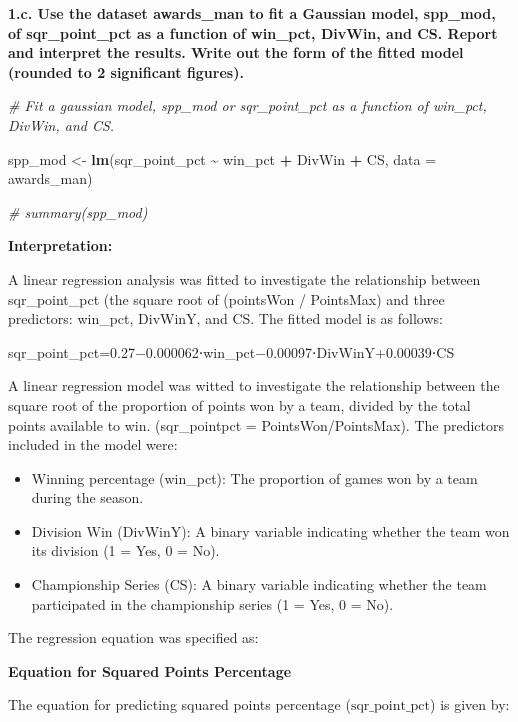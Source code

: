 \documentclass[
]{article}
\newenvironment{Shaded}{\begin{snugshade}}{\end{snugshade}}
\newcommand{\AttributeTok}[1]{\textcolor[rgb]{0.13,0.29,0.53}{#1}}
\newcommand{\CommentTok}[1]{\textcolor[rgb]{0.56,0.35,0.01}{\textit{#1}}}
\newcommand{\FunctionTok}[1]{\textcolor[rgb]{0.13,0.29,0.53}{\textbf{#1}}}
\newcommand{\NormalTok}[1]{#1}
\newcommand{\OtherTok}[1]{\textcolor[rgb]{0.56,0.35,0.01}{#1}}
\newcommand{\SpecialCharTok}[1]{\textcolor[rgb]{0.81,0.36,0.00}{\textbf{#1}}}
\begin{document}
\textbf{1.c. Use the dataset awards\_man to fit a Gaussian model,
spp\_mod, of sqr\_point\_pct as a function of win\_pct, DivWin, and CS.
Report and interpret the results. Write out the form of the fitted model
(rounded to 2 significant figures).}

\begin{Shaded}
\begin{Highlighting}[]
\CommentTok{\# Fit a gaussian model, spp\_mod or sqr\_point\_pct as a function of win\_pct, DivWin, and CS.}

\NormalTok{spp\_mod }\OtherTok{\textless{}{-}} \FunctionTok{lm}\NormalTok{(sqr\_point\_pct }\SpecialCharTok{\textasciitilde{}}\NormalTok{ win\_pct }\SpecialCharTok{+}\NormalTok{ DivWin }\SpecialCharTok{+}\NormalTok{ CS, }\AttributeTok{data =}\NormalTok{ awards\_man)}

\CommentTok{\# summary(spp\_mod)}
\end{Highlighting}
\end{Shaded}

\textbf{Interpretation:}

A linear regression analysis was fitted to investigate the relationship
between sqr\_point\_pct (the square root of (pointsWon / PointsMax) and
three predictors: win\_pct, DivWinY, and CS. The fitted model is as
follows:

sqr\_point\_pct=0.27−0.000062⋅win\_pct−0.00097⋅DivWinY+0.00039⋅CS

A linear regression model was witted to investigate the relationship
between the square root of the proportion of points won by a team,
divided by the total points available to win. (sqr\_pointpct =
PointsWon/PointsMax). The predictors included in the model were:

\begin{itemize}
\item
  Winning percentage (win\_pct): The proportion of games won by a team
  during the season.
\item
  Division Win (DivWinY): A binary variable indicating whether the team
  won its division (1 = Yes, 0 = No).
\item
  Championship Series (CS): A binary variable indicating whether the
  team participated in the championship series (1 = Yes, 0 = No).
\end{itemize}

The regression equation was specified as:

\textbf{Equation for Squared Points Percentage}

The equation for predicting squared points percentage
(\(\text{sqr\_point\_pct}\)) is given by:
\end{document}
